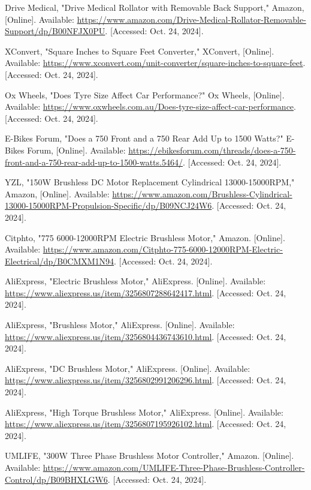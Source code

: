 \begin{thebibliography}{45}
	Drive Medical, "Drive Medical Rollator with Removable Back Support," Amazon, [Online]. Available: \url{https://www.amazon.com/Drive-Medical-Rollator-Removable-Support/dp/B00NFJX0PU}. [Accessed: Oct. 24, 2024]. 
	
	XConvert, "Square Inches to Square Feet Converter," XConvert, [Online]. Available: \url{https://www.xconvert.com/unit-converter/square-inches-to-square-feet}. [Accessed: Oct. 24, 2024]. 
	
	Ox Wheels, "Does Tyre Size Affect Car Performance?" Ox Wheels, [Online]. Available: \url{https://www.oxwheels.com.au/Does-tyre-size-affect-car-performance}. [Accessed: Oct. 24, 2024]. 
	
	E-Bikes Forum, "Does a 750 Front and a 750 Rear Add Up to 1500 Watts?" E-Bikes Forum, [Online]. Available: \url{https://ebikesforum.com/threads/does-a-750-front-and-a-750-rear-add-up-to-1500-watts.5464/}. [Accessed: Oct. 24, 2024]. 
	
	YZL, "150W Brushless DC Motor Replacement Cylindrical 13000-15000RPM," Amazon, [Online]. Available: \url{https://www.amazon.com/Brushless-Cylindrical-13000-15000RPM-Propulsion-Specific/dp/B09NCJ24W6}. [Accessed: Oct. 24, 2024]. 
	
	Citphto, "775 6000-12000RPM Electric Brushless Motor," Amazon. [Online]. Available: \url{https://www.amazon.com/Citphto-775-6000-12000RPM-Electric-Electrical/dp/B0CMXM1N94}. [Accessed: Oct. 24, 2024]. 
	
	AliExpress, "Electric Brushless Motor," AliExpress. [Online]. Available: \url{https://www.aliexpress.us/item/3256807288642417.html}. [Accessed: Oct. 24, 2024]. 
	
	AliExpress, "Brushless Motor," AliExpress. [Online]. Available: \url{https://www.aliexpress.us/item/3256804436743610.html}. [Accessed: Oct. 24, 2024]. 
	
	AliExpress, "DC Brushless Motor," AliExpress. [Online]. Available: \url{https://www.aliexpress.us/item/3256802991206296.html}. [Accessed: Oct. 24, 2024]. 
	
	AliExpress, "High Torque Brushless Motor," AliExpress. [Online]. Available: \url{https://www.aliexpress.us/item/3256807195926102.html}. [Accessed: Oct. 24, 2024]. 
	
	UMLIFE, "300W Three Phase Brushless Motor Controller," Amazon. [Online]. Available: \url{https://www.amazon.com/UMLIFE-Three-Phase-Brushless-Controller-Control/dp/B09BHXLGW6}. [Accessed: Oct. 24, 2024]. 
	

\end{thebibliography}
